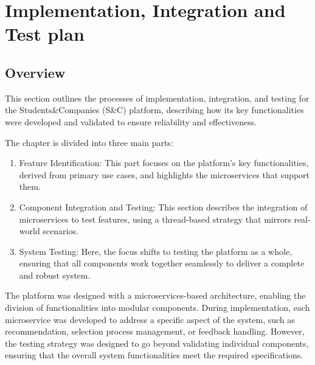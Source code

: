 \chapter{Implementation, Integration and Test plan}

\section{Overview}

This section outlines the processes of implementation, integration, and testing for the Students\&Companies
(S\&C) platform, describing how its key functionalities were developed and validated to ensure
reliability and effectiveness.

The chapter is divided into three main parts:

\begin{enumerate}
    \item Feature Identification: This part focuses on the platform's key functionalities, derived from
    primary use cases, and highlights the microservices that support them. 
    \item Component Integration and Testing: This section describes the integration of microservices
    to test features, using a thread-based strategy that mirrors real-world scenarios.
    \item System Testing: Here, the focus shifts to testing the platform as a whole, ensuring that
    all components work together seamlessly to deliver a complete and robust system.
\end{enumerate}

The platform was designed with a microservices-based architecture, enabling the division
of functionalities into modular components. During implementation, each microservice was
developed to address a specific aspect of the system, such as recommendation, selection
process management, or feedback handling. However, the testing strategy was designed to go
beyond validating individual components, ensuring that the overall system functionalities
meet the required specifications.

